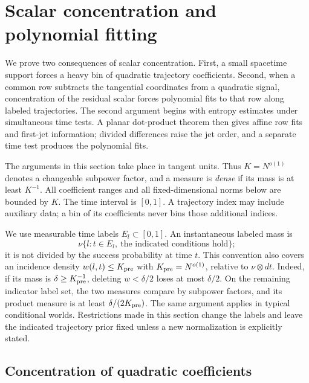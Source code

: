 \section{Scalar concentration and polynomial fitting}\label{sec:scalar-tools}

We prove two consequences of scalar concentration.  First, a small
spacetime support forces a heavy bin of quadratic trajectory
coefficients.  Second, when a common row subtracts the tangential
coordinates from a quadratic signal, concentration of the residual
scalar forces polynomial fits to that row along labeled trajectories.
The second argument begins with entropy estimates under simultaneous
time tests.  A planar dot-product theorem then gives affine row fits
and first-jet information; divided differences raise the jet order,
and a separate time test produces the polynomial fits.

The arguments in this section take place in tangent units.
Thus \(K=N^{o(1)}\) denotes a changeable subpower factor, and a measure is
\emph{dense} if its mass is at least \(K^{-1}\).  All coefficient ranges
and all fixed-dimensional norms below are bounded by \(K\).
The time interval is \([0,1]\).  A trajectory index may include auxiliary
data; a bin of its coefficients never bins those additional indices.

We use measurable time labels \(E_l\subset[0,1]\).
An instantaneous labeled mass is
\[
 \nu\{l:t\in E_l,\ \text{the indicated conditions hold}\};
\]
it is not divided by the success probability at time \(t\).
This convention also covers an incidence density \(w(l,t)\le K_{\rm pre}\)
with \(K_{\rm pre}=N^{o(1)}\), relative to \(\nu\otimes dt\).  Indeed, if its mass is
\(\delta\ge K_{\rm pre}^{-1}\), deleting \(w<\delta/2\) loses at most
\(\delta/2\).  On the remaining indicator label set, the two measures
compare by subpower factors, and its product measure is at least
\(\delta/(2K_{\rm pre})\).  The same argument applies in typical conditional
worlds.  Restrictions made in this section change the labels and leave
the indicated trajectory prior fixed unless a new normalization is
explicitly stated.

\subsection{Concentration of quadratic coefficients}


